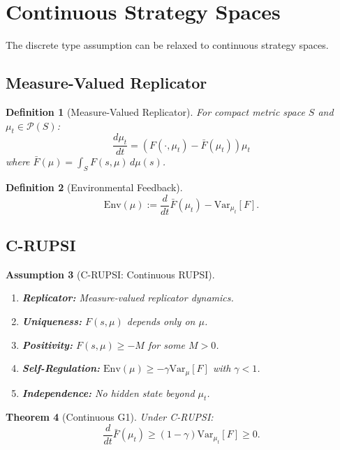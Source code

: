 \documentclass[12pt]{article}
\newtheorem{theorem}{Theorem}[section]
\newtheorem{definition}[theorem]{Definition}
\newtheorem{assumption}[theorem]{Assumption}
\newcommand{\Var}{\mathrm{Var}}
\begin{document}
\section{Continuous Strategy Spaces}
\label{sec:continuous}

The discrete type assumption can be relaxed to continuous strategy spaces.

\subsection{Measure-Valued Replicator}

\begin{definition}[Measure-Valued Replicator]
For compact metric space $S$ and $\mu_t \in \mathcal{P}(S)$:
\[
\frac{d\mu_t}{dt} = (F(\cdot, \mu_t) - \bar{F}(\mu_t)) \mu_t
\]
where $\bar{F}(\mu) = \int_S F(s, \mu) \, d\mu(s)$.
\end{definition}

\begin{definition}[Environmental Feedback]
\[
\mathrm{Env}(\mu) := \frac{d}{dt} \bar{F}(\mu_t) - \Var_{\mu_t}[F].
\]
\end{definition}

\subsection{C-RUPSI}

\begin{assumption}[C-RUPSI: Continuous RUPSI]
\begin{enumerate}
    \item \textbf{Replicator:} Measure-valued replicator dynamics.
    \item \textbf{Uniqueness:} $F(s, \mu)$ depends only on $\mu$.
    \item \textbf{Positivity:} $F(s, \mu) \geq -M$ for some $M > 0$.
    \item \textbf{Self-Regulation:} $\mathrm{Env}(\mu) \geq -\gamma \Var_\mu[F]$ with $\gamma < 1$.
    \item \textbf{Independence:} No hidden state beyond $\mu_t$.
\end{enumerate}
\end{assumption}

\begin{theorem}[Continuous G1]
\label{thm:continuous-g1}
Under C-RUPSI:
\[
\frac{d}{dt} \bar{F}(\mu_t) \geq (1 - \gamma) \Var_{\mu_t}[F] \geq 0.
\]
\end{theorem}
\end{document}
